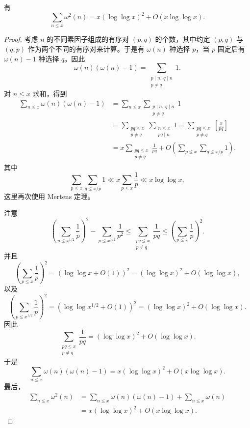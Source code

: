 \begin{theorem}[原文 Theorem 3.10]
	有
	\[
		\sum_{n\leq x}\omega^2(n)
		=
		x(\log\log x)^2+O(x\log\log x).
	\]
\end{theorem}

\begin{proof}
	考虑 $n$ 的不同素因子组成的有序对 $(p,q)$ 的个数，其中约定 $(p,q)$ 与 $(q,p)$ 作为两个不同的有序对来计算。于是有 $\omega(n)$ 种选择 $p$，当 $p$ 固定后有 $\omega(n)-1$ 种选择 $q$。因此
	\[
		\omega(n)(\omega(n)-1)
		=
		\sum_{\substack{p\mid n,\ q\mid n\\ p\neq q}}1.
	\]
	对 $n\leq x$ 求和，得到
	\[
	\begin{aligned}
		\sum_{n\leq x}\omega(n)(\omega(n)-1)
		&=
		\sum_{n\leq x}
		\sum_{\substack{p\mid n,\ q\mid n\\ p\neq q}}1 \\
		&=
		\sum_{\substack{pq\leq x\\ p\neq q}}
		\sum_{\substack{n\leq x\\ pq\mid n}}1
		=
		\sum_{\substack{pq\leq x\\ p\neq q}}
		\left[\frac{x}{pq}\right] \\
		&=
		x\sum_{\substack{pq\leq x\\ p\neq q}}\frac1{pq}
		+
		O\left(
			\sum_{p\leq x}\sum_{q\leq x/p}1
		\right).
	\end{aligned}
	\]
	其中
	\[
		\sum_{p\leq x}\sum_{q\leq x/p}1
		\ll
		x\sum_{p\leq x}\frac1p
		\ll
		x\log\log x,
	\]
	这里再次使用 Mertens 定理。

	注意
	\[
		\left(\sum_{p\leq x^{1/2}}\frac1p\right)^2
		-
		\sum_{p\leq x^{1/2}}\frac1{p^2}
		\leq
		\sum_{\substack{pq\leq x\\ p\neq q}}\frac1{pq}
		\leq
		\left(\sum_{p\leq x}\frac1p\right)^2.
	\]
	并且
	\[
		\left(\sum_{p\leq x}\frac1p\right)^2
		=
		(\log\log x+O(1))^2
		=
		(\log\log x)^2+O(\log\log x),
	\]
	以及
	\[
		\left(\sum_{p\leq x^{1/2}}\frac1p\right)^2
		=
		(\log\log x^{1/2}+O(1))^2
		=
		(\log\log x)^2+O(\log\log x).
	\]
	因此
	\[
		\sum_{\substack{pq\leq x\\ p\neq q}}\frac1{pq}
		=
		(\log\log x)^2+O(\log\log x).
	\]
	于是
	\[
		\sum_{n\leq x}\omega(n)(\omega(n)-1)
		=
		x(\log\log x)^2+O(x\log\log x).
	\]
	最后，
	\[
	\begin{aligned}
		\sum_{n\leq x}\omega^2(n)
		&=
		\sum_{n\leq x}\omega(n)(\omega(n)-1)
		+
		\sum_{n\leq x}\omega(n) \\
		&=
		x(\log\log x)^2+O(x\log\log x).
	\end{aligned}
	\]
\end{proof}

